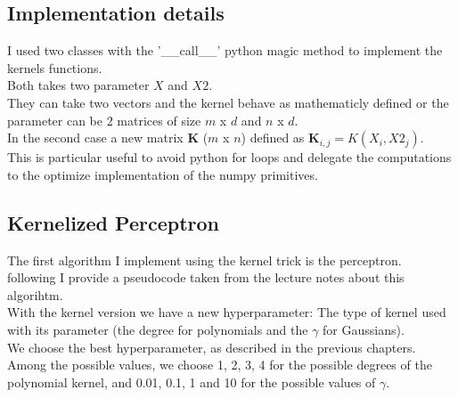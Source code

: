 \subsection{Implementation details}
I used two classes with the '\_\_call\_\_' python magic method to implement the kernels functions.\\
Both takes two parameter $X$ and $X2$.\\
They can take two vectors and the kernel behave as mathematicly defined or the parameter can be 2 matrices of size $m$ x $d$ and $n$ x $d$.\\
In the second case a new matrix $\boldsymbol{K}$ ($m$ x $n$) defined as $\boldsymbol{K}_{i, j} = K(X_i, X2_j)$.\\
This is particular useful to avoid python for loops and delegate the computations to the optimize implementation of the numpy primitives.\\


\subsection{Kernelized Perceptron}

The first algorithm I implement using the kernel trick is the perceptron.\\
following I provide a pseudocode taken from the lecture notes about this algorihtm.\\ 


With the kernel version we have a new hyperparameter: The type of kernel used with its parameter (the degree for polynomials and the $\gamma$ for Gaussians).\\
We choose the best hyperparameter, as described in the previous chapters.\\
Among the possible values, we choose 1, 2, 3, 4 for the possible degrees of the polynomial kernel, and 0.01, 0.1, 1 and 10 for the possible values of $\gamma$.\\

